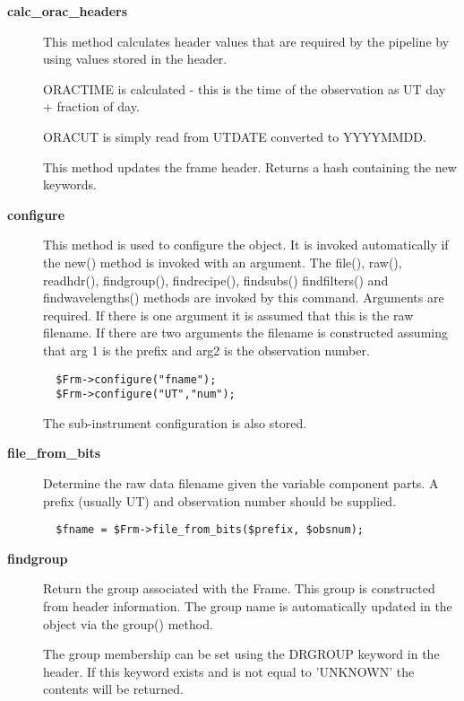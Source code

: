 \begin{description}
\item[\textbf{calc\_orac\_headers}] \mbox{}

This method calculates header values that are required by the
pipeline by using values stored in the header.



ORACTIME is calculated - this is the time of the observation as
UT day + fraction of day.



ORACUT is simply read from UTDATE converted to YYYYMMDD.



This method updates the frame header.
Returns a hash containing the new keywords.

\item[\textbf{configure}] \mbox{}

This method is used to configure the object. It is invoked
automatically if the new() method is invoked with an argument. The
file(), raw(), readhdr(), findgroup(), findrecipe(), findsubs() 
findfilters() and findwavelengths() methods are
invoked by this command. Arguments are required.
If there is one argument it is assumed that this is the
raw filename. If there are two arguments the filename is
constructed assuming that arg 1 is the prefix and arg2 is the
observation number.

\begin{verbatim}
  $Frm->configure("fname");
  $Frm->configure("UT","num");
\end{verbatim}


The sub-instrument configuration is also stored.

\item[\textbf{file\_from\_bits}] \mbox{}

Determine the raw data filename given the variable component
parts. A prefix (usually UT) and observation number should
be supplied.

\begin{verbatim}
  $fname = $Frm->file_from_bits($prefix, $obsnum);
\end{verbatim}
\item[\textbf{findgroup}] \mbox{}

Return the group associated with the Frame. This group is constructed
from header information. The group name is automatically updated in
the object via the group() method.



The group membership can be set using the DRGROUP keyword in the
header. If this keyword exists and is not equal to 'UNKNOWN' the
contents will be returned.




\end{description}
